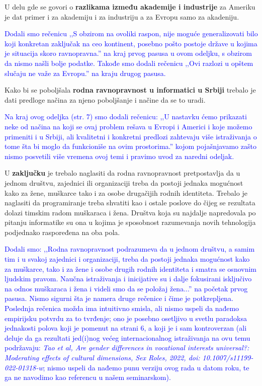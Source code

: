 \documentclass[a4paper]{report}
\newcommand{\odgovor}[1]{\textcolor{blue}{#1}}
\begin{document}
U delu gde se govori o \textbf{razlikama između akademije i industrije} za Ameriku je dat primer i za akademiju  i za industriju a za Evropu samo za akadeniju.

\odgovor{Dodali smo rečenicu ,,S obzirom na ovoliki raspon, nije moguće generalizovati bilo koji konkretan zaključak na ceo kontinent, posebno pošto postoje države u kojima je situacija skoro ravnopravna.'' na kraj prvog pasusa u ovom odeljku, s obzirom da nismo našli bolje podatke. Takođe smo dodali rečenicu ,,Ovi razlozi u opštem slučaju ne važe za Evropu.'' na kraju drugog pasusa.}

Kako bi se poboljšala \textbf{rodna ravnopravnost u informatici u Srbiji} trebalo je dati predloge načina za njeno poboljšanje i načine da se to uradi.

\odgovor{Na kraj ovog odeljka (str. 7) smo dodali rečenicu: ,,U nastavku ćemo prikazati neke od načina na koji se ovaj problem rešava u Evropi i Americi i koje možemo primeniti i u Srbiji, ali kvalitetni i konkretni predlozi zahtevaju više istraživanja o tome šta bi moglo da funkcioniše na ovim prostorima.'' kojom pojašnjavamo zašto nismo posvetili više vremena ovoj temi i pravimo uvod za naredni odeljak.}

U \textbf{zaključku} je trebalo naglasiti da rodna ravnopravnost pretpostavlja da u jednom društvu, zajednici ili organizaciji treba da postoji jednaka mogućnost kako za žene, muškarce tako i za osobe drugačijih rodnih identiteta. Trebalo je naglasiti da programiranje treba shvatiti kao i ostale poslove do čijeg se rezultata dolazi timskim radom muškaraca i žena. Društva koja su najdalje napredovala po pitanju informatike su ona u kojima je sposobnost razumevanja novih tehnologija podjednako raspoređena na oba pola.

\odgovor{Dodali smo: ,,Rodna ravnopravnost podrazumeva da u jednom društvu, a samim tim i u svakoj zajednici i organizaciji, treba da postoji jednaka mogućnost kako za muškarce, tako i za žene i osobe drugih rodnih identiteta i smatra se osnovnim ljudskim pravom. Naučna istraživanja i inicijative su i dalje fokusirani isključivo na odnos muškaraca i žena i videli smo da se položaj žena...'' na početak prvog pasusa. Nismo sigurni šta je namera druge rečenice i čime je potkrepljena. Poslednja rečenica možda ima intuitivno smisla, ali nismo uspeli da nađemo empirijsku potvrdu za to tvrđenje; ono je posebno osetljivo u svetlu paradoksa jednakosti polova koji je pomenut na strani 6, a koji je i sam kontroverzan (ali deluje da ga rezultati jed(i)nog većeg internacionalnog istraživanja na ovu temu podržavaju: \emph{Tao et al, Are gender differences in vocational interests universal?: Moderating effects of cultural dimensions, Sex Roles, 2022, doi: 10.1007/s11199-022-01318-w}; nismo uspeli da nađemo punu verziju ovog rada u datom roku, te ga ne navodimo kao referencu u našem seminarskom).}
\end{document}
